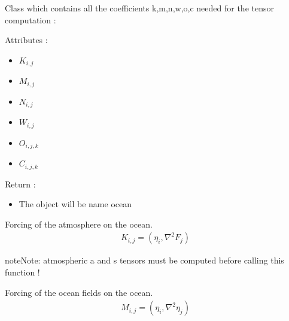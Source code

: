 \documentclass[letterpaper,10pt,english]{sphinxmanual}
\begin{document}
\begin{fulllineitems}
\label{rstfiles/inprod_analytic:inprod_analytic.ocean_tensors}
Class which contains all the coefficients k,m,n,w,o,c needed for the tensor computation :

Attributes :
\begin{itemize}
\item {} 
\(K_{i,j}\)

\item {} 
\(M_{i,j}\)

\item {} 
\(N_{i,j}\)

\item {} 
\(W_{i,j}\)

\item {} 
\(O_{i,j,k}\)

\item {} 
\(C_{i,j,k}\)

\end{itemize}

Return :
\begin{itemize}
\item {} 
The object will be name ocean

\end{itemize}

\begin{fulllineitems}
\label{rstfiles/inprod_analytic:inprod_analytic.ocean_tensors.calculate_K}
Forcing of the atmosphere on the ocean.
\begin{equation*}
\begin{split}K_{i,j} = (\eta_i, \nabla^2 F_j)\end{split}
\end{equation*}
\begin{notice}{note}{Note:}
atmospheric a and s tensors must be computed before calling
this function !
\end{notice}

\end{fulllineitems}


\begin{fulllineitems}
\label{rstfiles/inprod_analytic:inprod_analytic.ocean_tensors.calculate_M}
Forcing of the ocean fields on the ocean.
\begin{equation*}
\begin{split}M_{i,j} = (\eta_i, \nabla^2 \eta_j)\end{split}
\end{equation*}
\end{fulllineitems}


\end{fulllineitems}
\end{document}
